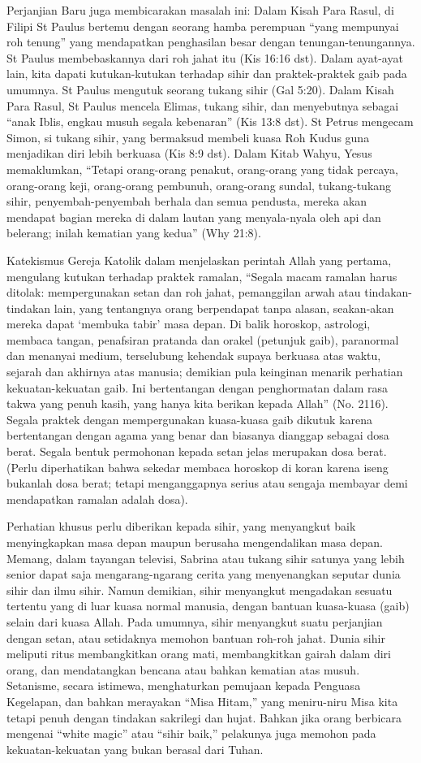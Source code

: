 Perjanjian Baru juga membicarakan masalah ini: Dalam Kisah Para Rasul, di Filipi St Paulus bertemu dengan seorang hamba perempuan “yang mempunyai roh tenung” yang mendapatkan penghasilan besar dengan tenungan-tenungannya. St Paulus membebaskannya dari roh jahat itu (Kis 16:16 dst). Dalam ayat-ayat lain, kita dapati kutukan-kutukan terhadap sihir dan praktek-praktek gaib pada umumnya. St Paulus mengutuk seorang tukang sihir (Gal 5:20). Dalam Kisah Para Rasul, St Paulus mencela Elimas, tukang sihir, dan menyebutnya sebagai “anak Iblis, engkau musuh segala kebenaran” (Kis 13:8 dst). St Petrus mengecam Simon, si tukang sihir, yang bermaksud membeli kuasa Roh Kudus guna menjadikan diri lebih berkuasa (Kis 8:9 dst). Dalam Kitab Wahyu, Yesus memaklumkan, “Tetapi orang-orang penakut, orang-orang yang tidak percaya, orang-orang keji, orang-orang pembunuh, orang-orang sundal, tukang-tukang sihir, penyembah-penyembah berhala dan semua pendusta, mereka akan mendapat bagian mereka di dalam lautan yang menyala-nyala oleh api dan belerang; inilah kematian yang kedua” (Why 21:8).

Katekismus Gereja Katolik dalam menjelaskan perintah Allah yang pertama, mengulang kutukan terhadap praktek ramalan, “Segala macam ramalan harus ditolak: mempergunakan setan dan roh jahat, pemanggilan arwah atau tindakan-tindakan lain, yang tentangnya orang berpendapat tanpa alasan, seakan-akan mereka dapat `membuka tabir' masa depan. Di balik horoskop, astrologi, membaca tangan, penafsiran pratanda dan orakel (petunjuk gaib), paranormal dan menanyai medium, terselubung kehendak supaya berkuasa atas waktu, sejarah dan akhirnya atas manusia; demikian pula keinginan menarik perhatian kekuatan-kekuatan gaib. Ini bertentangan dengan penghormatan dalam rasa takwa yang penuh kasih, yang hanya kita berikan kepada Allah” (No. 2116). Segala praktek dengan mempergunakan kuasa-kuasa gaib dikutuk karena bertentangan dengan agama yang benar dan biasanya dianggap sebagai dosa berat. Segala bentuk permohonan kepada setan jelas merupakan dosa berat. (Perlu diperhatikan bahwa sekedar membaca horoskop di koran karena iseng bukanlah dosa berat; tetapi menganggapnya serius atau sengaja membayar demi mendapatkan ramalan adalah dosa).

Perhatian khusus perlu diberikan kepada sihir, yang menyangkut baik menyingkapkan masa depan maupun berusaha mengendalikan masa depan. Memang, dalam tayangan televisi, Sabrina atau tukang sihir satunya yang lebih senior dapat saja mengarang-ngarang cerita yang menyenangkan seputar dunia sihir dan ilmu sihir. Namun demikian, sihir menyangkut mengadakan sesuatu tertentu yang di luar kuasa normal manusia, dengan bantuan kuasa-kuasa (gaib) selain dari kuasa Allah. Pada umumnya, sihir menyangkut suatu perjanjian dengan setan, atau setidaknya memohon bantuan roh-roh jahat. Dunia sihir meliputi ritus membangkitkan orang mati, membangkitkan gairah dalam diri orang, dan mendatangkan bencana atau bahkan kematian atas musuh. Setanisme, secara istimewa, menghaturkan pemujaan kepada Penguasa Kegelapan, dan bahkan merayakan “Misa Hitam,” yang meniru-niru Misa kita tetapi penuh dengan tindakan sakrilegi dan hujat. Bahkan jika orang berbicara mengenai “white magic” atau “sihir baik,” pelakunya juga memohon pada kekuatan-kekuatan yang bukan berasal dari Tuhan.

